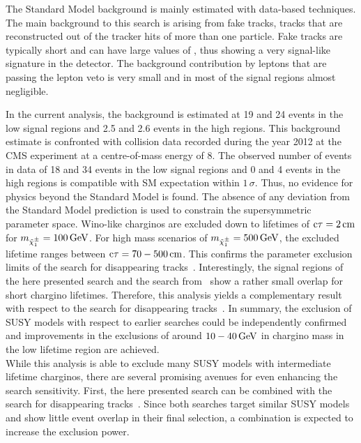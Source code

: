 The Standard Model background is mainly estimated with data-based techniques.
The main background to this search is arising from fake tracks, \ie tracks that are reconstructed out of the tracker hits of more than one particle.
Fake tracks are typically short and can have large values of \ias, thus showing a very signal-like signature in the detector.
The background contribution by leptons that are passing the lepton veto is very small and in most of the signal regions almost negligible.

In the current analysis, the background is estimated at 19 and 24 events in the low \ias signal regions and 2.5 and 2.6 events in the high \ias regions.
This background estimate is confronted with collision data recorded during the year 2012 at the CMS experiment at a centre-of-mass energy of 8\tev.
The observed number of events in data of 18 and 34 events in the low \ias signal regions and 0 and 4 events in the high \ias regions is compatible with SM expectation within $1\,\sigma$.
Thus, no evidence for physics beyond the Standard Model is found. 
The absence of any deviation from the Standard Model prediction is used to constrain the supersymmetric parameter space.
Wino-like charginos are excluded down to lifetimes of $\text{c}\tau=2\,\text{cm}$ for $m_{\tilde{\chi}^{\pm}_{1}}=100\,\text{Ge}\kern-0.06667em\text{V}$.
For high mass scenarios of $m_{\tilde{\chi}^{\pm}_{1}}=500\,\text{Ge}\kern-0.06667em\text{V}$, the excluded lifetime ranges between $\text{c}\tau=70-500\,\text{cm}$.
This confirms the parameter exclusion limits of the search for disappearing tracks~\cite{bib:CMS:DT_8TeV}.
Interestingly, the signal regions of the here presented search and the search from~\cite{bib:CMS:DT_8TeV} show a rather small overlap for short chargino lifetimes.
Therefore, this analysis yields a complementary result with respect to the search for disappearing tracks~\cite{bib:CMS:DT_8TeV}.
In summary, the exclusion of SUSY models with respect to earlier searches could be independently confirmed and improvements in the exclusions of around $10-40\,\text{Ge}\kern-0.06667em\text{V}$ in chargino mass in the low lifetime region are achieved.\\

While this analysis is able to exclude many SUSY models with intermediate lifetime charginos, there are several promising avenues for even enhancing the search sensitivity.
First, the here presented search can be combined with the search for disappearing tracks~\cite{bib:CMS:DT_8TeV}.
Since both searches target similar SUSY models and show little event overlap in their final selection, a combination is expected to increase the exclusion power.

